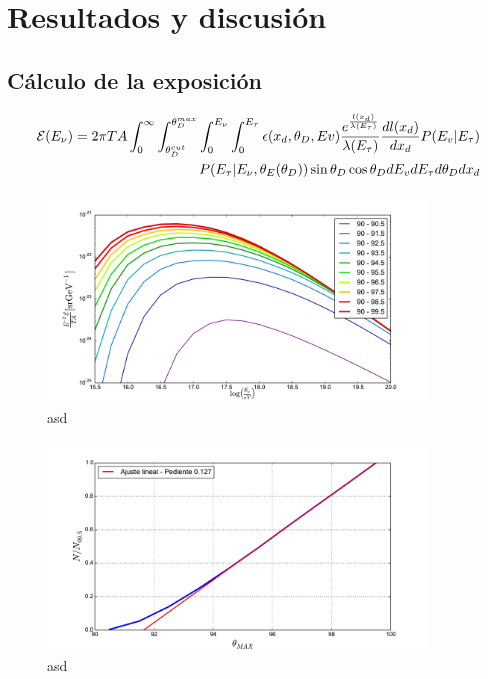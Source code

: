 \chapter{Resultados y discusi\'on}
\label{ch:resultadosRadio}

\section{C\'alculo de la exposici\'on}
	
	
	
	\begin{displaymath}
		\begin{aligned}
			{\cal E} (E_\nu) = 2 \pi T A
			\int_{0}^{\infty} 
			\int_{\theta_D^{cut}}^{\theta_D^{max}} 
			\int_{0}^{E_\nu} 
			\int_{0}^{E_\tau} 
			\epsilon (x_d,\theta_D,Ev) 
			\frac{e^{\frac{l(x_d)}{\lambda(E_\tau)}}}{\lambda(E_\tau)}\frac{dl(x_d)}{dx_d}
			P(E_v|E_\tau)\\
			P(E_\tau|E_\nu,\theta_E(\theta_D))
			\sin \theta_D \cos \theta_D
			dE_v dE_\tau  d\theta_D dx_d
		\end{aligned}
	\end{displaymath}
	
	\begin{figure}[h!]
		\begin{center}
			\includegraphics[width=0.9\textwidth]{fig/resultadosRadio/exposureFullEff_thetas}
			\caption{asd}
			\label{fig:}
		\end{center}
	\end{figure}
	
	\begin{figure}[h!]
		\begin{center}
			\includegraphics[width=0.9\textwidth]{fig/resultadosRadio/eventGain_thetas}
			\caption{asd}
			\label{fig:}
		\end{center}
	\end{figure}
	
